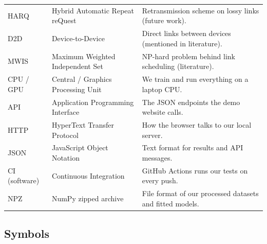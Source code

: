 {\begin{longtable}{@{}p{2.6cm}p{5.2cm}p{7.6cm}@{}}
HARQ & Hybrid Automatic Repeat reQuest & Retransmission scheme on lossy links (future work). \\
D2D & Device-to-Device & Direct links between devices (mentioned in literature). \\
MWIS & Maximum Weighted Independent Set & NP-hard problem behind link scheduling (literature). \\
CPU / GPU & Central / Graphics Processing Unit & We train and run everything on a laptop CPU. \\
API & Application Programming Interface & The JSON endpoints the demo website calls. \\
HTTP & HyperText Transfer Protocol & How the browser talks to our local server. \\
JSON & JavaScript Object Notation & Text format for results and API messages. \\
CI (software) & Continuous Integration & GitHub Actions runs our tests on every push. \\
NPZ & NumPy zipped archive & File format of our processed datasets and fitted models. \\
\bottomrule
\end{longtable}
}

\subsection{Symbols}

